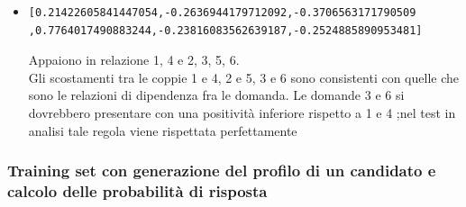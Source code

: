 \documentclass[10pt,a4paper]{article}
\begin{document}
\begin{itemize}
\item \begin{verbatim}[0.21422605841447054,-0.2636944179712092,-0.3706563171790509
,0.7764017490883244,-0.23816083562639187,-0.2524885890953481]\end{verbatim}
Appaiono in relazione 1, 4 e 2, 3, 5, 6.\\
Gli scostamenti tra le coppie  1 e 4, 2 e 5, 3 e 6 sono consistenti con quelle che sono le relazioni di dipendenza fra le domanda.
Le domande 3 e 6 si dovrebbero presentare con una positivit\`a inferiore rispetto a 1 e 4 ;nel test in analisi tale regola viene rispettata perfettamente

\end{itemize}


\subsubsection{Training set con generazione del profilo di un candidato e calcolo delle probabilit\`a di risposta}
\end{document}
